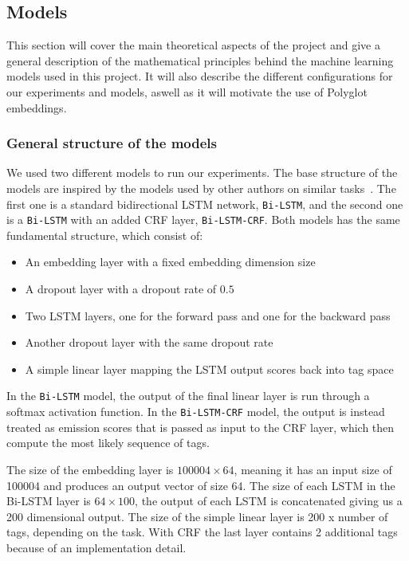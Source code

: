 
\subsection{Models}

This section will cover the main theoretical aspects of the project and give a
general description of the mathematical principles behind the machine learning
models used in this project. It will also describe the different configurations
for our experiments and models, aswell as it will motivate the use of Polyglot
embeddings.


\subsubsection{General structure of the models}

We used two different models to run our experiments. The base structure of the
models are inspired by the models used by other authors on similar
tasks~\cite{ALL THE PAPERS!}. The first one is a standard bidirectional LSTM
network, \texttt{Bi-LSTM}, and the second one is a \texttt{Bi-LSTM} with an
added CRF layer, \texttt{Bi-LSTM-CRF}. Both models has the same fundamental
structure, which consist of:

\begin{itemize}
    \item An embedding layer with a fixed embedding dimension size
    \item A dropout layer with a dropout rate of $0.5$
    \item Two LSTM layers, one for the forward pass and one for the backward
        pass
    \item Another dropout layer with the same dropout rate
    \item A simple linear layer mapping the LSTM output scores back into tag
        space
\end{itemize}

In the \texttt{Bi-LSTM} model, the output of the final linear layer is run
through a softmax activation function. In the \texttt{Bi-LSTM-CRF} model, the
output is instead treated as emission scores that is passed as input to the CRF
layer, which then compute the most likely sequence of tags.

The size of the embedding layer is $100004 \times 64$, meaning it has an input
size of 100004 and produces an output vector of size 64. The size of each LSTM
in the Bi-LSTM layer is $64 \times 100$, the output of each LSTM is concatenated
giving us a 200 dimensional output. The size of the simple linear layer is 200 x
number of tags, depending on the task. With CRF the last layer contains 2
additional tags because of an implementation detail.

